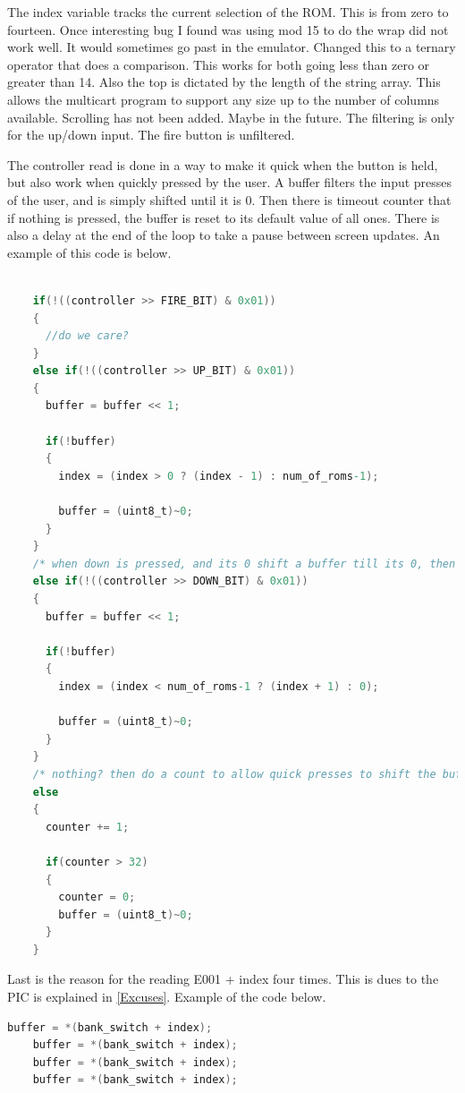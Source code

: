 \documentclass{article}
\begin{document}
  \par
  The index variable tracks the current selection of the ROM. This is from zero to fourteen. Once interesting bug I found was using mod 15 to do the wrap did
  not work well. It would sometimes go past in the emulator. Changed this to a ternary operator that does a comparison. This works for both going
  less than zero or greater than 14. Also the top is dictated by the length of the string array. This allows the multicart program to support any size up to
  the number of columns available. Scrolling has not been added. Maybe in the future. The filtering is only for the up/down input. The fire button is
  unfiltered.
  \par
  The controller read is done in a way to make it quick when the button is held, but also work when quickly pressed by the user. A buffer filters the input
  presses of the user, and is simply shifted until it is 0. Then there is timeout counter that if nothing is pressed, the buffer is reset to its default value
  of all ones. There is also a delay at the end of the loop to take a pause between screen updates. An example of this code is below.

  \begin{lstlisting}[language=C]

    if(!((controller >> FIRE_BIT) & 0x01))
    {
      //do we care?
    }
    else if(!((controller >> UP_BIT) & 0x01))
    {
      buffer = buffer << 1;

      if(!buffer)
      {
        index = (index > 0 ? (index - 1) : num_of_roms-1);

        buffer = (uint8_t)~0;
      }
    }
    /* when down is pressed, and its 0 shift a buffer till its 0, then increment index to move the highlight down the screen */
    else if(!((controller >> DOWN_BIT) & 0x01))
    {
      buffer = buffer << 1;

      if(!buffer)
      {
        index = (index < num_of_roms-1 ? (index + 1) : 0);

        buffer = (uint8_t)~0;
      }
    }
    /* nothing? then do a count to allow quick presses to shift the buffer, and if its been to long, clear everything out */
    else
    {
      counter += 1;

      if(counter > 32)
      {
        counter = 0;
        buffer = (uint8_t)~0;
      }
    }

  \end{lstlisting}

  \par
  Last is the reason for the reading E001 + index four times. This is dues to the PIC is explained in \ref{Excuses}. Example of the code below.

  \begin{lstlisting}[language=C]
    buffer = *(bank_switch + index);
    buffer = *(bank_switch + index);
    buffer = *(bank_switch + index);
    buffer = *(bank_switch + index);
  \end{lstlisting}
\end{document}

